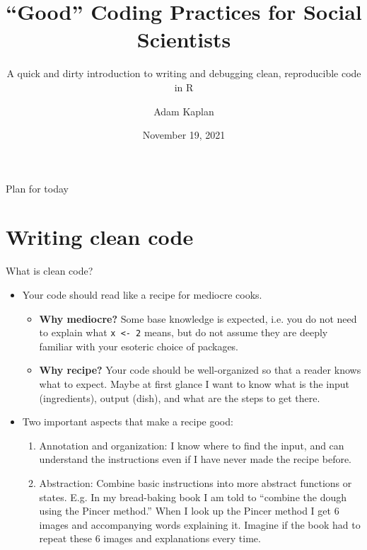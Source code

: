\documentclass[aspectratio=169,xcolor=dvipsnames]{beamer}\usepackage[]{graphicx}\usepackage[]{color}
\title[]{``Good'' Coding Practices for Social Scientists}
\subtitle{A quick and dirty introduction to writing and debugging clean, reproducible code in R}
\author[]{\large{Adam Kaplan}}
\institute[]{Massachusetts Institute of Technology}
\date[]{November 19, 2021}
\begin{document}
\begin{frame}
    \titlepage
\end{frame}

\begin{frame}{Plan for today}
		\tableofcontents
	\end{frame}


\section{Writing clean code}

\begin{frame}[t]{What is clean code?}
  \begin{itemize}
    \item Your code should read like a recipe for mediocre cooks.\pause
    \begin{itemize}
      \item \textbf{Why mediocre?} \pause Some base knowledge is expected, i.e. you do not need to explain what \texttt{x <- 2} means, but do not assume they are deeply familiar with your esoteric choice of packages. \pause
      \item \textbf{Why recipe?} \pause Your code should be well-organized so that a reader knows what to expect. Maybe at first glance I want to know what is the input (ingredients), output (dish), and what are the steps to get there.
    \end{itemize}\pause
    \item Two important aspects that make a recipe good:\pause
    \begin{enumerate}
      \item \alert{Annotation and organization:} I know where to find the input, and can understand the instructions even if I have never made the recipe before.\pause
      \item \alert{Abstraction:} Combine basic instructions into more abstract functions or states. E.g. In my bread-baking book I am told to ``combine the dough using the Pincer method.'' When I look up the Pincer method I get 6 images and accompanying words explaining it. Imagine if the book had to repeat these 6 images and explanations every time.
    \end{enumerate}
  \end{itemize}
\end{frame}
\end{document}
